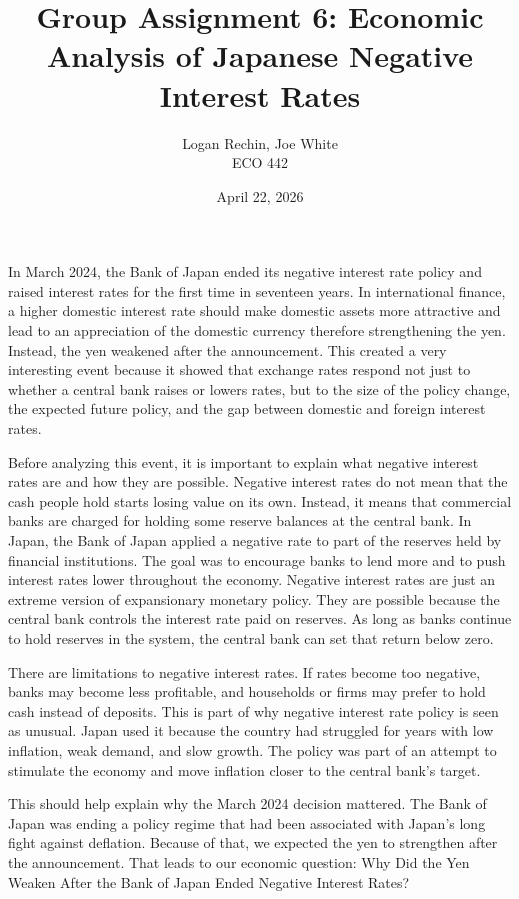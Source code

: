 \documentclass[12pt]{article}
\begin{document}
\title{Group Assignment 6: Economic Analysis of Japanese Negative Interest Rates\\[0.5em]}
\author{Logan Rechin, Joe White\\ECO 442}
\date{April 22, 2026}
\maketitle

In March 2024, the Bank of Japan ended its negative interest rate policy and raised interest rates for the first time in seventeen years. In international finance, a higher domestic interest rate should make domestic assets more attractive and lead to an appreciation of the domestic currency therefore strengthening the yen. Instead, the yen weakened after the announcement. This created a very interesting event because it showed that exchange rates respond not just to whether a central bank raises or lowers rates, but to the size of the policy change, the expected future policy, and the gap between domestic and foreign interest rates.

Before analyzing this event, it is important to explain what negative interest rates are and how they are possible. Negative interest rates do not mean that the cash people hold starts losing value on its own. Instead, it means that commercial banks are charged for holding some reserve balances at the central bank. In Japan, the Bank of Japan applied a negative rate to part of the reserves held by financial institutions. The goal was to encourage banks to lend more and to push interest rates lower throughout the economy. Negative interest rates are just an extreme version of expansionary monetary policy. They are possible because the central bank controls the interest rate paid on reserves. As long as banks continue to hold reserves in the system, the central bank can set that return below zero.

There are limitations to negative interest rates. If rates become too negative, banks may become less profitable, and households or firms may prefer to hold cash instead of deposits. This is part of why negative interest rate policy is seen as unusual. Japan used it because the country had struggled for years with low inflation, weak demand, and slow growth. The policy was part of an attempt to stimulate the economy and move inflation closer to the central bank's target.

This should help explain why the March 2024 decision mattered. The Bank of Japan was ending a policy regime that had been associated with Japan's long fight against deflation. Because of that, we expected the yen to strengthen after the announcement. That leads to our economic question: Why Did the Yen Weaken After the Bank of Japan Ended Negative Interest Rates?
\end{document}
